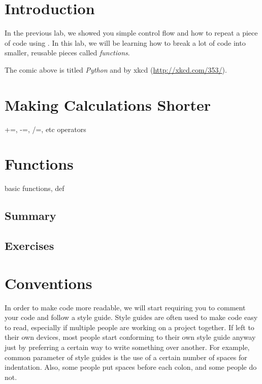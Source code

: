 \documentclass[11pt]{cselabheader}
\begin{document}
\section*{Introduction}
\label{sec:intro}

In the previous lab, we showed you simple control flow and how to repeat a piece
of code using . In this lab, we will be learning how to
break a lot of code into smaller, reusable pieces called \emph{functions}.

The comic above is titled \emph{Python} and by xkcd (\url{http://xkcd.com/353/}).

\pagebreak

\tableofcontents

\pagebreak
{}
\section{Making Calculations Shorter}
\label{sec:calc}

+=, -=, /=, etc operators

\pagebreak
\section{Functions}
\label{sec:funcs}

basic functions, def

\subsection{Summary}
\label{subsec:funcs.sum}

\subsection{Exercises}
\label{subsec:funcs.ex}

\pagebreak
\section{Conventions}
\label{sec:pep8}

In order to make code more readable, we will start requiring you to comment your
code and follow a style guide. Style guides are often used to make code easy to
read, especially if multiple people are working on a project together. If left
to their own devices, most people start conforming to their own style guide
anyway just by preferring a certain way to write something over another. For
example, common parameter of style guides is the use of a certain number of
spaces for indentation. Also, some people put spaces before each colon, and some
people do not.
\end{document}
